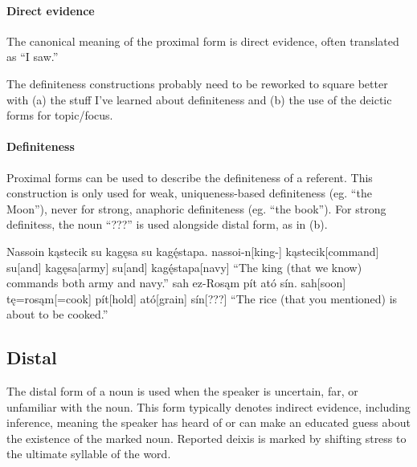 \paragraph{Direct evidence}
The canonical meaning of the proximal form is direct evidence, often translated as “I saw.” 

\begin{kaobox}[frametitle=\sc todo:]
    The definiteness constructions probably need to be reworked to square better with (a) the stuff I've learned about definiteness and (b) the use of the deictic forms for topic/focus.
\end{kaobox}

\paragraph{Definiteness}
Proximal forms can be used to describe the definiteness of a referent. This construction is only used for weak, uniqueness-based definiteness (eg. “the Moon”), never for strong, anaphoric definiteness (eg. “the book”). For strong definitess, the noun  “???” is used alongside distal form, as in (\nextx b).

\begin{gloss*}
    \a \begingl
        \glpreamble Nassoin kąstecik su kagęsa su kagę́stapa. \endpreamble
            nassoi-n[king-]
            kąstecik[command]
            su[and]
            kagęsa[army]
            su[and]
            kagę́stapa[navy]
        \glft “The king (that we know) commands both army and navy.”
    \endgl
    \a \begingl
        \glpreamble sah ez-Rosąm pít ató sín. \endpreamble
            sah[soon]
            tę=rosąm[=cook]
            pít[hold\tbs{}]
            ató[grain\tbs{}]
            sín[???\tbs{}]
        \glft “The rice (that you mentioned) is about to be cooked.”
    \endgl
\end{gloss*}

\subsection{Distal}
The distal form of a noun is used when the speaker is uncertain, far, or unfamiliar with the noun. 
This form typically denotes indirect evidence, including inference, meaning the speaker has heard of or can make an educated guess about the existence of the marked noun. Reported deixis is marked by shifting stress to the ultimate syllable of the word.

